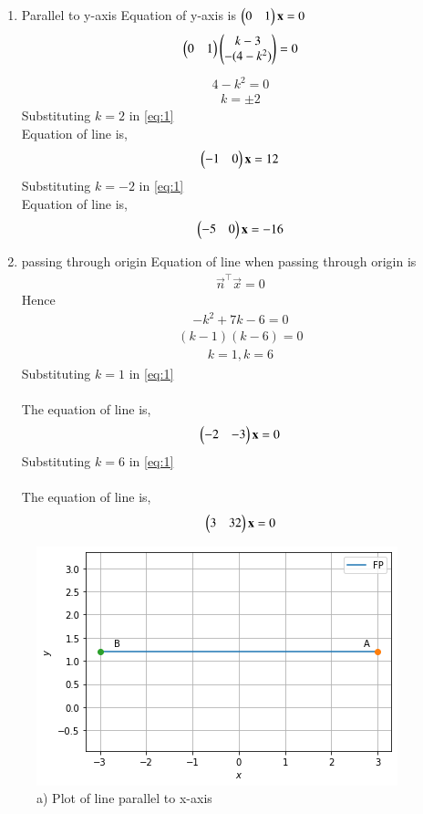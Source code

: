 \documentclass[journal,12pt,twocolumn]{IEEEtran}
\begin{document}
\begin{enumerate}
\item Parallel to y-axis
Equation of y-axis is $\begin{pmatrix}0 & 1\end{pmatrix}\mathbf{x}=0$\\
\begin{align}
  \begin{pmatrix}0 & 1\end{pmatrix}\begin{pmatrix}k-3\\-(4-k^2)\end{pmatrix} =0
\end{align}
\begin{align}
   4-k^2=0
\end{align}
\begin{align}
    k=\pm2
\end{align}
Substituting $k=2$ in \eqref{eq:1}\\
Equation of line is,
\begin{align}
     \begin{pmatrix}-1 & 0\end{pmatrix}\mathbf{x}=12
\end{align}
Substituting $k=-2$ in \eqref{eq:1}\\
Equation of line is,
\begin{align}
  \begin{pmatrix}-5 & 0\end{pmatrix}\mathbf{x}=-16
\end{align}
\item passing through origin
Equation of line when passing through origin is 
\begin{align}
\vec{n}^\top\vec{x}=0
\end{align}
Hence
\begin{align}
    -k^2+7k-6=0
\end{align}
\begin{align}
     (k-1)(k-6)=0
\end{align}
\begin{align}
    k=1, k=6
\end{align}
Substituting $k=1$ in \eqref{eq:1}\\
\\
The equation of line is,
\begin{align}
\begin{pmatrix}-2&-3\end{pmatrix}\mathbf{x} = 0
\end{align}
Substituting $k=6$ in \eqref{eq:1}\\
\\
The equation of line is,
\begin{align}
  \begin{pmatrix}3 & 32\end{pmatrix}\mathbf{x} = 0
\end{align}
\end{enumerate}
\begin{figure}[!h]
         \centering
         \includegraphics[width=\columnwidth]{parallel to x axis.png}
         \caption{a) Plot of line parallel to x-axis}
         \label{Figure}
\end{figure}
\end{document}
